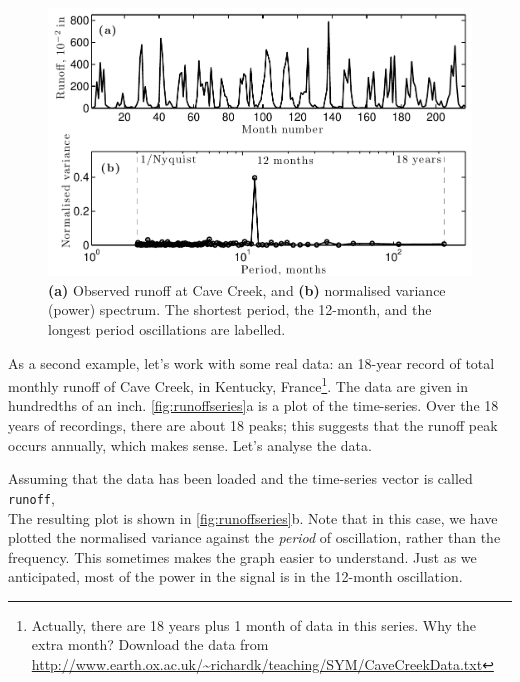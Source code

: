 \documentclass[11pt,twoside,a4paper]{article}
\begin{document}
\begin{figure}[bt]
  \centering
  \includegraphics[width=5in]{../figs/L15/SeriesAndSpectrum_2}
  \caption{\textbf{(a)} Observed runoff at Cave Creek, and
    \textbf{(b)} normalised variance (power) spectrum. The shortest
    period, the 12-month, and the longest period oscillations are
    labelled. }
  \label{fig:runoffseries}
\end{figure}

As a second example, let's work with some real data: an 18-year record
of total monthly runoff of Cave Creek, in Kentucky,
France\footnote{Actually, there are 18 years plus 1 month of data in
  this series.  Why the extra month? Download the data from
  \url{http://www.earth.ox.ac.uk/~richardk/teaching/SYM/CaveCreekData.txt}}.
The data are given in hundredths of an inch.
\autoref{fig:runoffseries}a is a plot of the time-series.  Over the 18
years of recordings, there are about 18 peaks; this suggests that the
runoff peak occurs annually, which makes sense.  Let's analyse the
data.

Assuming that the data has been loaded and the time-series vector is
called \texttt{runoff},
\\[1mm]
The resulting plot is shown in \autoref{fig:runoffseries}b.  Note that
in this case, we have plotted the normalised variance against the
\textit{period} of oscillation, rather than the frequency.  This
sometimes makes the graph easier to understand.  Just as we
anticipated, most of the power in the signal is in the 12-month
oscillation. 
\end{document}
